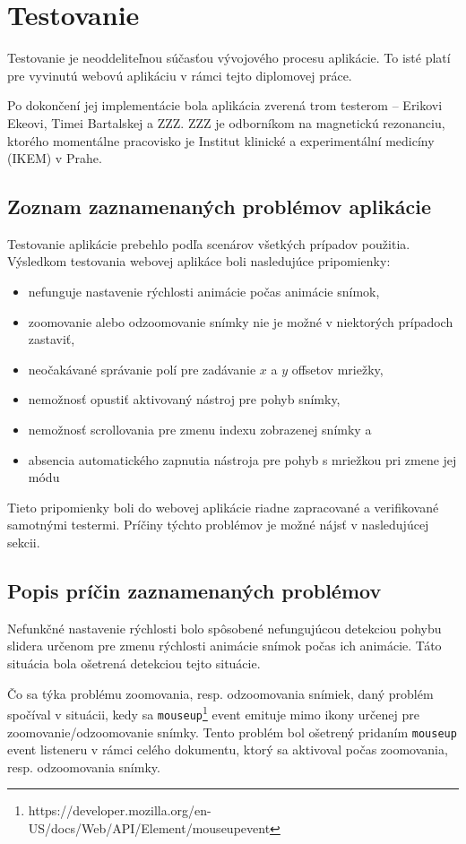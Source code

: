\chapter {Testovanie}
Testovanie je neoddeliteľnou súčasťou vývojového procesu aplikácie. To isté platí pre vyvinutú webovú aplikáciu v rámci tejto diplomovej práce.

Po dokončení jej implementácie bola aplikácia zverená trom testerom -- Erikovi Ekeovi, Timei Bartalskej a ZZZ. ZZZ je odborníkom na magnetickú rezonanciu, ktorého momentálne pracovisko je Institut klinické a experimentální medicíny (IKEM) v Prahe. 

\section {Zoznam zaznamenaných problémov aplikácie}
Testovanie aplikácie prebehlo podľa scenárov všetkých prípadov použitia. Výsledkom testovania webovej aplikáce boli nasledujúce pripomienky:
\begin {itemize}
\item {nefunguje nastavenie rýchlosti animácie počas animácie snímok,}
\item {zoomovanie alebo odzoomovanie snímky nie je možné v niektorých prípadoch zastaviť,}
\item {neočakávané správanie polí pre zadávanie $x$ a $y$ offsetov mriežky,}
\item {nemožnosť opustiť aktivovaný nástroj pre pohyb snímky,}
\item {nemožnosť scrollovania pre zmenu indexu zobrazenej snímky a}
\item {absencia automatického zapnutia nástroja pre pohyb s mriežkou pri zmene jej módu}
\end {itemize}

Tieto pripomienky boli do webovej aplikácie riadne zapracované a verifikované samotnými testermi.
Príčiny týchto problémov je možné nájsť v nasledujúcej sekcii.

\section {Popis príčin zaznamenaných problémov}
Nefunkčné nastavenie rýchlosti bolo spôsobené nefungujúcou detekciou pohybu slidera určenom pre zmenu rýchlosti animácie snímok počas ich animácie. Táto situácia bola ošetrená detekciou tejto situácie.

Čo sa týka problému zoomovania, resp. odzoomovania snímiek, daný problém spočíval v situácii, kedy sa \texttt{mouseup}\footnote{https://developer.mozilla.org/en-US/docs/Web/API/Element/mouseup\textunderscore event} event emituje mimo ikony určenej pre zoomovanie/odzoomovanie snímky. Tento problém bol ošetrený pridaním \texttt{mouseup} event listeneru v rámci celého dokumentu, ktorý sa aktivoval počas zoomovania, resp. odzoomovania snímky.

